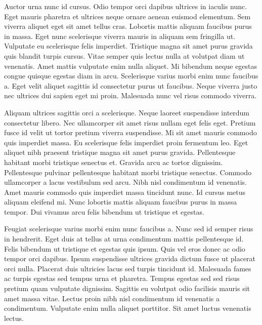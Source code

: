 \documentclass[
]{book}
\begin{document}
Auctor urna nunc id cursus. Odio tempor orci dapibus ultrices in iaculis nunc. Eget mauris pharetra et ultrices neque ornare aenean euismod elementum. Sem viverra aliquet eget sit amet tellus cras. Lobortis mattis aliquam faucibus purus in massa. Eget nunc scelerisque viverra mauris in aliquam sem fringilla ut. Vulputate eu scelerisque felis imperdiet. Tristique magna sit amet purus gravida quis blandit turpis cursus. Vitae semper quis lectus nulla at volutpat diam ut venenatis. Amet mattis vulputate enim nulla aliquet. Mi bibendum neque egestas congue quisque egestas diam in arcu. Scelerisque varius morbi enim nunc faucibus a. Eget velit aliquet sagittis id consectetur purus ut faucibus. Neque viverra justo nec ultrices dui sapien eget mi proin. Malesuada nunc vel risus commodo viverra.

Aliquam ultrices sagittis orci a scelerisque. Neque laoreet suspendisse interdum consectetur libero. Nec ullamcorper sit amet risus nullam eget felis eget. Pretium fusce id velit ut tortor pretium viverra suspendisse. Mi sit amet mauris commodo quis imperdiet massa. Eu scelerisque felis imperdiet proin fermentum leo. Eget aliquet nibh praesent tristique magna sit amet purus gravida. Pellentesque habitant morbi tristique senectus et. Gravida arcu ac tortor dignissim. Pellentesque pulvinar pellentesque habitant morbi tristique senectus. Commodo ullamcorper a lacus vestibulum sed arcu. Nibh nisl condimentum id venenatis. Amet mauris commodo quis imperdiet massa tincidunt nunc. Id cursus metus aliquam eleifend mi. Nunc lobortis mattis aliquam faucibus purus in massa tempor. Dui vivamus arcu felis bibendum ut tristique et egestas.

Feugiat scelerisque varius morbi enim nunc faucibus a. Nunc sed id semper risus in hendrerit. Eget duis at tellus at urna condimentum mattis pellentesque id. Felis bibendum ut tristique et egestas quis ipsum. Quis vel eros donec ac odio tempor orci dapibus. Ipsum suspendisse ultrices gravida dictum fusce ut placerat orci nulla. Placerat duis ultricies lacus sed turpis tincidunt id. Malesuada fames ac turpis egestas sed tempus urna et pharetra. Tempus egestas sed sed risus pretium quam vulputate dignissim. Sagittis eu volutpat odio facilisis mauris sit amet massa vitae. Lectus proin nibh nisl condimentum id venenatis a condimentum. Vulputate enim nulla aliquet porttitor. Sit amet luctus venenatis lectus.
\end{document}
